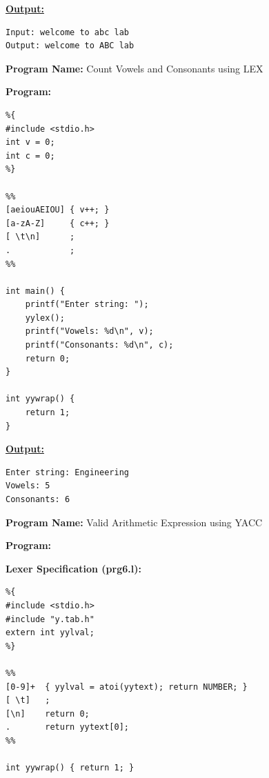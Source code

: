 \documentclass[11pt,a4paper]{article}
\begin{document}
\vspace{0.6em}
\noindent\textbf{\underline{Output:}}\par\vspace{0.4em}
\begin{lstlisting}
Input: welcome to abc lab
Output: welcome to ABC lab
\end{lstlisting}

\clearpage
\noindent\textbf{\large Program Name:} Count Vowels and Consonants using LEX\par\vspace{0.6em}
\noindent\textbf{\large Program:}\par\vspace{0.3em}
\begin{lstlisting}
%{
#include <stdio.h>
int v = 0;
int c = 0;
%}

%%
[aeiouAEIOU] { v++; }
[a-zA-Z]     { c++; }
[ \t\n]      ;
.            ;
%%

int main() {
    printf("Enter string: ");
    yylex();
    printf("Vowels: %d\n", v);
    printf("Consonants: %d\n", c);
    return 0;
}

int yywrap() {
    return 1;
}
\end{lstlisting}

\vspace{0.6em}
\noindent\textbf{\underline{Output:}}\par\vspace{0.4em}
\begin{lstlisting}
Enter string: Engineering
Vowels: 5
Consonants: 6
\end{lstlisting}

\clearpage
\noindent\textbf{\large Program Name:} Valid Arithmetic Expression using YACC\par\vspace{0.6em}
\noindent\textbf{\large Program:}\par\vspace{0.3em}
\noindent\textbf{Lexer Specification (prg6.l):}\par\vspace{0.2em}
\begin{lstlisting}
%{
#include <stdio.h>
#include "y.tab.h"
extern int yylval;
%}

%%
[0-9]+  { yylval = atoi(yytext); return NUMBER; }
[ \t]   ;
[\n]    return 0;
.       return yytext[0];
%%

int yywrap() { return 1; }
\end{lstlisting}
\end{document}
